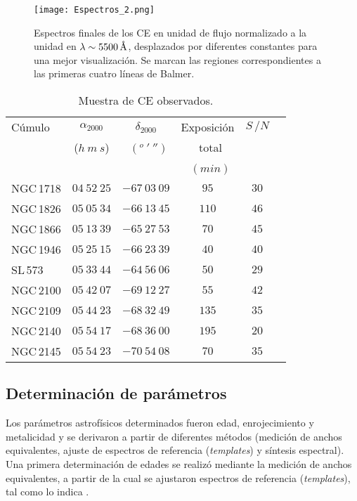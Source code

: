 \documentclass[baaa]{baaa}
\begin{document}
\begin{figure*}
\centering
\texttt{[image: Espectros\_2.png]}
\caption{Espectros finales de los CE en unidad de flujo normalizado a la unidad en $ \lambda\sim5500\,\mathrm{\textup{\r{A}}}$, desplazados por diferentes constantes para una mejor visualización. Se marcan las regiones correspondientes a las primeras cuatro líneas de Balmer.}
\label{F1}
\end{figure*}

\begin{table}[!h]
\centering
\caption{Muestra de CE observados.}
\begin{tabular}{lccccc}
\hline\hline\noalign{\smallskip}
\!\!Cúmulo & \!\!$\alpha_{2000}$ & \!\!$\delta_{2000}$ & \!\!\!Exposición & \!\! $S \, /N$  \\
\!\! & \!\!\!\!($h\ m\ s$)& \!\!\ $(^o\ '\ '')$ & \!\!\ total\\ 
\!\! & \!\ & \!\!\ & \!\!\ $(min)$ \\
\hline\noalign{\smallskip}
\!NGC\,1718 & $04\ 52\ 25$ & $-67\ 03\ 09$ & $95$  & $30$ \\
\!NGC\,1826 & $05\ 05\ 34$ & $-66\ 13\ 45$ & $110$ & $46$ \\
\!NGC\,1866 & $05\ 13\ 39$ & $-65\ 27\ 53$ & $70$  & $45$ \\
\!NGC\,1946 & $05\ 25\ 15$ & $-66\ 23\ 39$ & $40$  & $40$ \\
\!SL\,573   & $05\ 33\ 44$ & $-64\ 56\ 06$ & $50$  & $29$ \\
\!NGC\,2100 & $05\ 42\ 07$ & $-69\ 12\ 27$ & $55$  & $42$ \\
\!NGC\,2109 & $05\ 44\ 23$ & $-68\ 32\ 49$ & $135$ & $35$ \\
\!NGC\,2140 & $05\ 54\ 17$ & $-68\ 36\ 00$ & $195$ & $20$ \\
\!NGC\,2145 & $05\ 54\ 23$ & $-70\ 54\ 08$ & $70$  & $35$ \\
\hline
\end{tabular}
\label{T1}
\end{table}


\subsection{Determinación de parámetros}

Los parámetros astrofísicos determinados fueron edad, enrojecimiento y metalicidad y se derivaron a partir de diferentes métodos (medición de anchos equivalentes, ajuste de espectros de referencia ({\it templates}) y síntesis espectral). Una primera determinación de edades se realizó mediante la medición de anchos equivalentes, a partir de la cual se ajustaron espectros de referencia (\textit{templates}), tal como lo indica \cite{TR2023}. 
\end{document}
